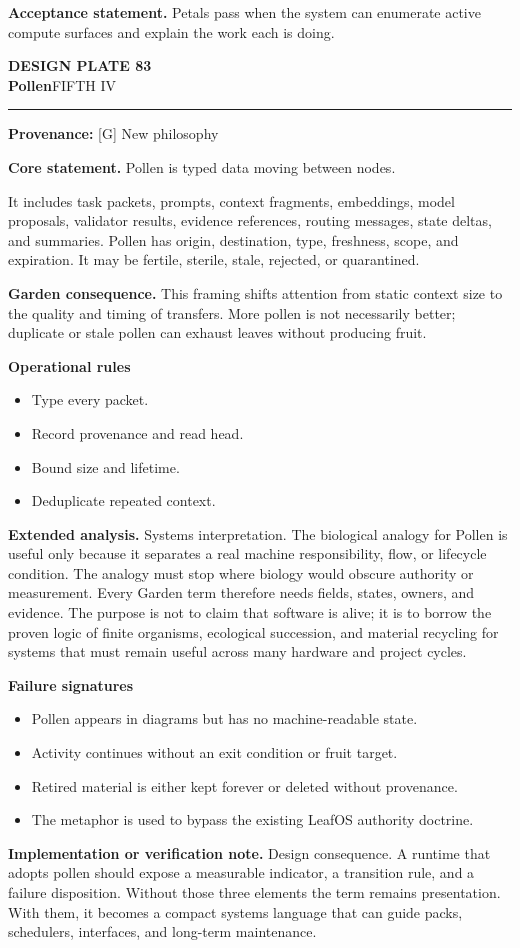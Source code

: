 \documentclass[10pt,letterpaper,oneside]{article}
\newcommand{\prov}[1]{\textcolor{gardenBlue}{\sffamily\footnotesize\textbf{Provenance:} #1}}
\newcommand{\platetitle}[3]{%
  \begin{minipage}[t][0.54in][t]{\textwidth}
  {\sffamily\bfseries\color{gardenDeep}\fontsize{9}{10}\selectfont DESIGN PLATE #1}\\[-1pt]
  {\sffamily\bfseries\color{gardenInk}\fontsize{16.5}{18}\selectfont #2}\hfill{\sffamily\color{gardenGreen}\large #3}
  \end{minipage}\vspace{-2pt}\hrule\vspace{5pt}}
\begin{document}
\begin{acceptbox}
\textbf{Acceptance statement.} Petals pass when the system can enumerate active compute surfaces and explain the work each is doing.
\end{acceptbox}
\newpage
\platetitle{83}{Pollen}{FIFTH IV}
\prov{[G] New philosophy}
\fontsize{8.85}{10.45}\selectfont
\begin{corebox}
\textbf{Core statement.} Pollen is typed data moving between nodes.
\end{corebox}
It includes task packets, prompts, context fragments, embeddings, model proposals, validator results, evidence references, routing messages, state deltas, and summaries. Pollen has origin, destination, type, freshness, scope, and expiration. It may be fertile, sterile, stale, rejected, or quarantined.

\textbf{Garden consequence.} This framing shifts attention from static context size to the quality and timing of transfers. More pollen is not necessarily better; duplicate or stale pollen can exhaust leaves without producing fruit.

\textbf{Operational rules}
\begin{itemize}
\item Type every packet.
\item Record provenance and read head.
\item Bound size and lifetime.
\item Deduplicate repeated context.
\end{itemize}
\textbf{Extended analysis.} Systems interpretation. The biological analogy for Pollen is useful only because it separates a real machine responsibility, flow, or lifecycle condition. The analogy must stop where biology would obscure authority or measurement. Every Garden term therefore needs fields, states, owners, and evidence. The purpose is not to claim that software is alive; it is to borrow the proven logic of finite organisms, ecological succession, and material recycling for systems that must remain useful across many hardware and project cycles.

\textbf{Failure signatures}
\begin{itemize}
\item Pollen appears in diagrams but has no machine-readable state.
\item Activity continues without an exit condition or fruit target.
\item Retired material is either kept forever or deleted without provenance.
\item The metaphor is used to bypass the existing LeafOS authority doctrine.
\end{itemize}
\textbf{Implementation or verification note.} Design consequence. A runtime that adopts pollen should expose a measurable indicator, a transition rule, and a failure disposition. Without those three elements the term remains presentation. With them, it becomes a compact systems language that can guide packs, schedulers, interfaces, and long-term maintenance.
\end{document}
